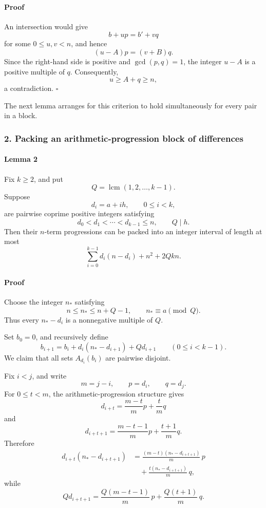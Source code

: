 \documentclass[
  11pt,
  a4paper,
]{article}
\begin{document}
\paragraph{Proof}\label{proof}

An intersection would give \[
b+up=b'+vq
\] for some \(0\le u,v<n\), and hence \[
(u-A)p=(v+B)q.
\] Since the right-hand side is positive and \(\gcd(p,q)=1\), the
integer \(u-A\) is a positive multiple of \(q\). Consequently, \[
u\ge A+q\ge n,
\] a contradiction. \(\square\)

The next lemma arranges for this criterion to hold simultaneously for
every pair in a block.

\subsubsection{2. Packing an arithmetic-progression block of
differences}\label{packing-an-arithmetic-progression-block-of-differences}

\paragraph{Lemma 2}\label{lemma-2}

Fix \(k\ge2\), and put \[
Q=\operatorname{lcm}(1,2,\ldots,k-1).
\] Suppose \[
d_i=a+ih,\qquad 0\le i<k,
\] are pairwise coprime positive integers satisfying \[
d_0<d_1<\cdots<d_{k-1}\le n,
\qquad Q\mid h.
\] Then their \(n\)-term progressions can be packed into an integer
interval of length at most \[
\boxed{\;
\sum_{i=0}^{k-1}d_i(n-d_i)+n^2+2Qkn.
\;}
\]

\paragraph{Proof}\label{proof-1}

Choose the integer \(n_*\) satisfying \[
n\le n_*\le n+Q-1,
\qquad n_*\equiv a\pmod Q.
\] Thus every \(n_*-d_i\) is a nonnegative multiple of \(Q\).

Set \(b_0=0\), and recursively define \[
b_{i+1}
=
b_i+d_i(n_*-d_{i+1})+Qd_{i+1}
\qquad(0\le i<k-1).
\] We claim that all sets \(A_{d_i}(b_i)\) are pairwise disjoint.

Fix \(i<j\), and write \[
m=j-i,\qquad p=d_i,\qquad q=d_j.
\] For \(0\le t<m\), the arithmetic-progression structure gives \[
d_{i+t}=\frac{m-t}{m}p+\frac{t}{m}q
\] and \[
d_{i+t+1}
=\frac{m-t-1}{m}p+\frac{t+1}{m}q.
\] Therefore \begin{equation*}
\begin{aligned}
d_{i+t}(n_*-d_{i+t+1})
&=
\frac{(m-t)(n_*-d_{i+t+1})}{m}\,p\\
&\quad+
\frac{t(n_*-d_{i+t+1})}{m}\,q,
\end{aligned}
\end{equation*} while \[
Qd_{i+t+1}
=
\frac{Q(m-t-1)}m\,p
+
\frac{Q(t+1)}m\,q.
\]
\end{document}
